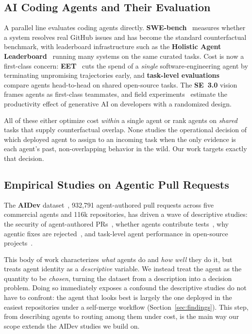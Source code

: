 \subsection{AI Coding Agents and Their Evaluation}

A parallel line evaluates coding agents directly. \textbf{SWE-bench}~\cite{jimenez2024swebench} measures whether a system resolves real GitHub issues and has become the standard counterfactual benchmark, with leaderboard infrastructure such as the \textbf{Holistic Agent Leaderboard}~\cite{holistic2025leaderboard} running many systems on the same curated tasks. Cost is now a first-class concern: \textbf{EET}~\cite{eet2026} cuts the spend of a \emph{single} software-engineering agent by terminating unpromising trajectories early, and \textbf{task-level evaluations}~\cite{tasklevel2026eval} compare agents head-to-head on shared open-source tasks. The \textbf{SE~3.0} vision~\cite{li2025se3} frames agents as first-class teammates, and field experiments~\cite{cui2024genai} estimate the productivity effect of generative AI on developers with a randomized design.

All of these either optimize cost \emph{within} a single agent or rank agents on \emph{shared} tasks that supply counterfactual overlap. None studies the operational decision of which deployed agent to assign to an incoming task when the only evidence is each agent's past, non-overlapping behavior in the wild. Our work targets exactly that decision.

\subsection{Empirical Studies on Agentic Pull Requests}

The \textbf{AIDev} dataset~\cite{li2026aidev}, 932,791 agent-authored pull requests across five commercial agents and 116k repositories, has driven a wave of descriptive studies: the security of agent-authored PRs~\cite{security2026teammates}, whether agents contribute tests~\cite{haque2026tests}, why agentic fixes are rejected~\cite{rejection2026fixes}, and task-level agent performance in open-source projects~\cite{tasklevel2026eval}.

This body of work characterizes \emph{what} agents do and \emph{how well} they do it, but treats agent identity as a \emph{descriptive} variable. We instead treat the agent as the quantity to be \emph{chosen}, turning the dataset from a description into a decision problem. Doing so immediately exposes a confound the descriptive studies do not have to confront: the agent that looks best is largely the one deployed in the easiest repositories under a self-merge workflow (Section~\ref{sec:findings}). This step, from describing agents to routing among them under cost, is the main way our scope extends the AIDev studies we build on.


